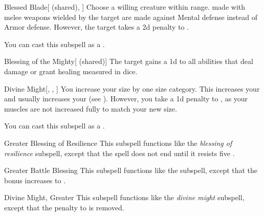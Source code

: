 \begin{ability}[\nth{3}]{Blessed Blade}[ (shared), ]
Choose a willing creature within \rngclose range.
 made with melee weapons wielded by the target are made against Mental defense instead of Armor defense.
However, the target takes a \minus2d penalty to .

You can cast this subspell as a .
\end{ability}
\vspace{0.25em}


\begin{ability}[\nth{3}]{Blessing of the Mighty}[ (shared)]
The target gains a \plus1d  to all abilities that deal damage or grant healing measured in dice.
\end{ability}
\vspace{0.25em}


\begin{ability}[\nth{3}]{Divine Might}[, , ]
You increase your size by one size category.
This increases your  and usually increases your  (see ).
However, you take a \minus1d penalty to , as your muscles are not increased fully to match your new size.

You can cast this subspell as a .
\end{ability}
\vspace{0.25em}


\begin{ability}[\nth{4}]{Greater Blessing of Resilience}
This subspell functions like the \textit{blessing of resilience} subspell, except that the spell does not end until it resists five .
\end{ability}
\vspace{0.25em}


\begin{ability}[\nth{5}]{Greater Battle Blessing}
This subspell functions like the  subspell, except that the bonus increases to .
\end{ability}
\vspace{0.25em}


\begin{ability}[\nth{6}]{Divine Might, Greater}
This subspell functions like the \textit{divine might} subspell, except that the penalty to  is removed.
\end{ability}
\vspace{0.25em}


